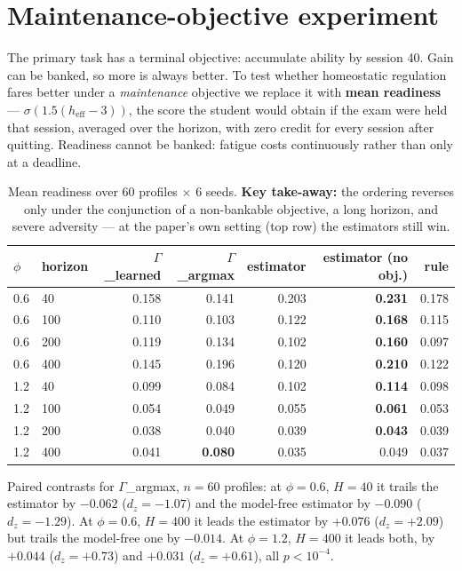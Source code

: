 \documentclass{article}
\begin{document}
\section{Maintenance-objective experiment}
\label{app:maintenance}
The primary task has a terminal objective: accumulate ability by session 40. Gain can be banked, so more is always better. To test whether homeostatic regulation fares better under a \emph{maintenance} objective we replace it with \textbf{mean readiness} --- $\sigma(1.5(h_{\text{eff}}-3))$, the score the student would obtain if the exam were held that session, averaged over the horizon, with zero credit for every session after quitting. Readiness cannot be banked: fatigue costs continuously rather than only at a deadline.

\begin{table}[H]
  \caption{Mean readiness over 60 profiles $\times$ 6 seeds. \textbf{Key take-away:} the ordering reverses only under the conjunction of a non-bankable objective, a long horizon, and severe adversity --- at the paper's own setting (top row) the estimators still win.}
  \centering\small
  \begin{tabular}{llrrrrr}
    \toprule
    $\phi$ & horizon & $\Gamma$\_learned & $\Gamma$\_argmax & estimator & estimator (no obj.) & rule \\
    \midrule
    0.6 & 40  & 0.158 & 0.141 & 0.203 & \textbf{0.231} & 0.178 \\
    0.6 & 100 & 0.110 & 0.103 & 0.122 & \textbf{0.168} & 0.115 \\
    0.6 & 200 & 0.119 & 0.134 & 0.102 & \textbf{0.160} & 0.097 \\
    0.6 & 400 & 0.145 & 0.196 & 0.120 & \textbf{0.210} & 0.122 \\
    \midrule
    1.2 & 40  & 0.099 & 0.084 & 0.102 & \textbf{0.114} & 0.098 \\
    1.2 & 100 & 0.054 & 0.049 & 0.055 & \textbf{0.061} & 0.053 \\
    1.2 & 200 & 0.038 & 0.040 & 0.039 & \textbf{0.043} & 0.039 \\
    1.2 & 400 & 0.041 & \textbf{0.080} & 0.035 & 0.049 & 0.037 \\
    \bottomrule
  \end{tabular}
\end{table}
Paired contrasts for $\Gamma$\_argmax, $n{=}60$ profiles: at $\phi{=}0.6$, $H{=}40$ it trails the estimator by $-0.062$ ($d_z{=}{-}1.07$) and the model-free estimator by $-0.090$ ($d_z{=}{-}1.29$). At $\phi{=}0.6$, $H{=}400$ it leads the estimator by $+0.076$ ($d_z{=}{+}2.09$) but trails the model-free one by $-0.014$. At $\phi{=}1.2$, $H{=}400$ it leads both, by $+0.044$ ($d_z{=}{+}0.73$) and $+0.031$ ($d_z{=}{+}0.61$), all $p<10^{-4}$.
\end{document}
